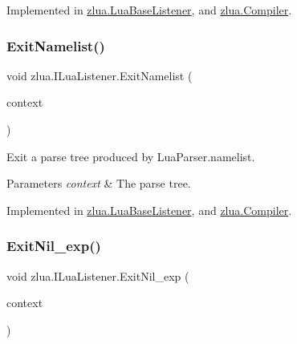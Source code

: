 Implemented in \mbox{\hyperlink{classzlua_1_1_lua_base_listener_ae26d62193f8285daad3361d083e45c58}{zlua.\+Lua\+Base\+Listener}}, and \mbox{\hyperlink{classzlua_1_1_compiler_afa2dba6f3e7fb7b060741a58bdac97f4}{zlua.\+Compiler}}.

\mbox{\label{interfacezlua_1_1_i_lua_listener_acd614a0aa9df1e1ead1690e7598414df}} 
\subsubsection{\texorpdfstring{Exit\+Namelist()}{ExitNamelist()}}
{\footnotesize\ttfamily void zlua.\+I\+Lua\+Listener.\+Exit\+Namelist (\begin{DoxyParamCaption}\item[{\mbox{[}\+Not\+Null\mbox{]} \mbox{\hyperlink{classzlua_1_1_lua_parser_1_1_namelist_context}{Lua\+Parser.\+Namelist\+Context}}}]{context }\end{DoxyParamCaption})}



Exit a parse tree produced by Lua\+Parser.\+namelist. 


\begin{DoxyParams}{Parameters}
{\em context} & The parse tree.\\
\hline
\end{DoxyParams}


Implemented in \mbox{\hyperlink{classzlua_1_1_lua_base_listener_aa501c2703fd2c5279c7cd6748aebd84b}{zlua.\+Lua\+Base\+Listener}}, and \mbox{\hyperlink{classzlua_1_1_compiler_ad35fb734ce46c317f3d6005186ff5a11}{zlua.\+Compiler}}.

\mbox{\label{interfacezlua_1_1_i_lua_listener_a7b5aa1a0b4e1441c884028a324f69439}} 
\subsubsection{\texorpdfstring{Exit\+Nil\+\_\+exp()}{ExitNil\_exp()}}
{\footnotesize\ttfamily void zlua.\+I\+Lua\+Listener.\+Exit\+Nil\+\_\+exp (\begin{DoxyParamCaption}\item[{\mbox{[}\+Not\+Null\mbox{]} \mbox{\hyperlink{classzlua_1_1_lua_parser_1_1_nil__exp_context}{Lua\+Parser.\+Nil\+\_\+exp\+Context}}}]{context }\end{DoxyParamCaption})}



